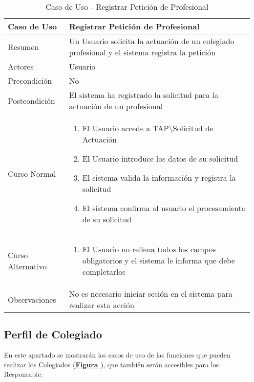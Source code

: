\begin{table}[!htbp]
  \centering  \addtocounter{casouso}{1}
  \begin{tabular}{|l | p{100mm}|}
    \textbf{Caso de Uso}  & \textbf{Registrar Petición de Profesional} \\ \hline
    Resumen 		 & Un Usuario solicita la actuación de un colegiado profesional y el sistema registra la petición \\ \hline
    Actores  		 & Usuario \\ \hline
    Precondición  	 & No \\ \hline
    Postcondición  	 & El sistema ha registrado la solicitud para la actuación de un profesional \\ \hline
    Curso Normal   	 & \begin{enumerate}
	  \item El Usuario accede a TAP\textbackslash Solicitud de Actuación
	  \item El Usuario introduce los datos de su solicitud
	  \item El sistema valida la información y registra la solicitud
	  \item El sistema confirma al usuario el procesamiento de su solicitud
    \end{enumerate}  \\ \hline
    Curso Alternativo  & \begin{enumerate}
	  \item El Usuario no rellena todos los campos obligatorios y el sistema le informa que debe completarlos
    \end{enumerate}  \\ \hline
    Observaciones 	 & No es necesario iniciar sesión en el sistema para realizar esta acción  \\ \hline
  \end{tabular}
  \caption{Caso de Uso  - Registrar Petición de Profesional}
  \label{tab:cuuRegPeticProf}
\end{table}
\FloatBarrier


\subsection{Perfil de Colegiado}

\addtocounter{figura}{1}
En este apartado se mostrarán los casos de uso de las funciones que pueden realizar los Colegiados (\textbf{\hyperref[fig:CasosDeUso_Colegiado]{Figura }}), que también serán accesibles para los Responsable.

